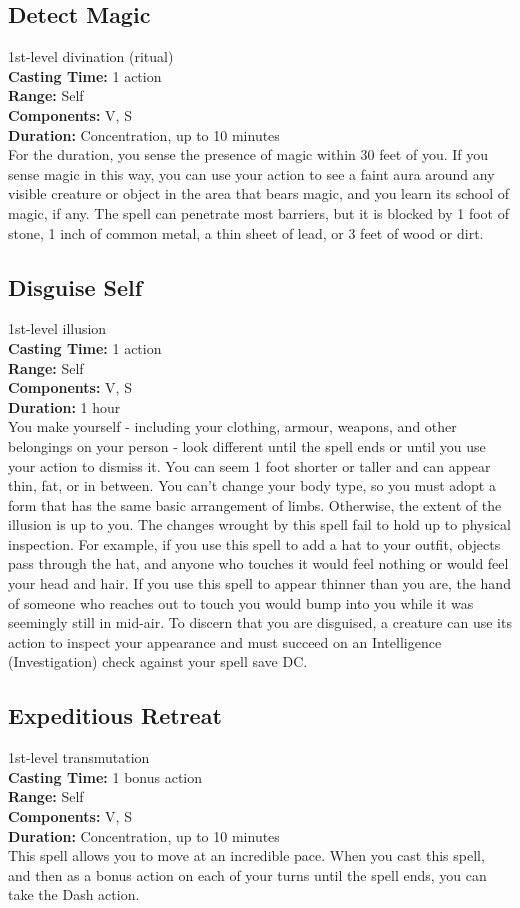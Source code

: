 \documentclass[11pt, A4paper, english]{article}
\begin{document}
		\subsection{Detect Magic}
1st-level divination (ritual) \\
\textbf{Casting Time:} 1 action \\
\textbf{Range:} Self \\
\textbf{Components:} V, S \\
\textbf{Duration:} Concentration, up to 10 minutes \\
For the duration, you sense the presence of magic within 30 feet of you. If you sense magic in this way, you can use your action to see a faint aura around any visible creature or object in the area that bears magic, and you learn its school of magic, if any. The spell can penetrate most barriers, but it is blocked by 1  foot of stone, 1 inch of common metal, a thin sheet of lead, or 3 feet of wood or dirt.

		\subsection{Disguise Self}
1st-level illusion \\
\textbf{Casting Time:} 1 action \\
\textbf{Range:} Self \\
\textbf{Components:} V, S \\
\textbf{Duration:} 1 hour \\
You make yourself - including your clothing, armour, weapons, and other belongings on your person - look different until the spell ends or until you use your action to dismiss it. You can seem 1  foot shorter or taller and can appear thin, fat, or in between. You can’t change your body type, so you must adopt a form that has the same basic arrangement of limbs. Otherwise, the extent of the illusion is up to you. The changes wrought by this spell fail to hold up to physical inspection. For example, if you use this spell to add a hat to your outfit, objects pass through the hat, and anyone who touches it would feel nothing or would feel your head and hair. If you use this spell to appear thinner than you are, the hand of someone who reaches out to touch you would bump into you while it was seemingly still in mid-air. To discern that you are disguised, a creature can use its action to inspect your appearance and must succeed on an Intelligence (Investigation) check against your spell save DC.

		\subsection{Expeditious Retreat}
1st-level transmutation \\
\textbf{Casting Time:} 1 bonus action \\
\textbf{Range:} Self \\
\textbf{Components:} V, S \\
\textbf{Duration:} Concentration, up to 10 minutes \\
This spell allows you to move at an incredible pace. When you cast this spell, and then as a bonus action on each of your turns until the spell ends, you can take the Dash action.
\end{document}
